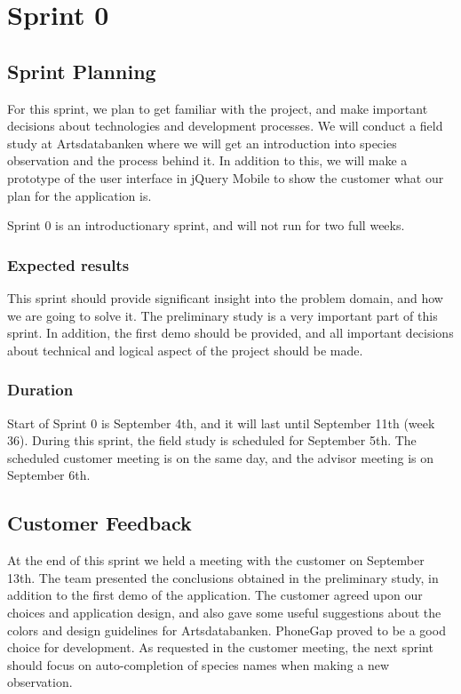 \section{Sprint 0}

\subsection{Sprint Planning}
For this sprint, we plan to get familiar with the project, and make important
decisions about technologies and development processes. We will conduct a field
study at Artsdatabanken where we will get an introduction into species
observation and the process behind it. In addition to this, we will make a
prototype of the user interface in jQuery Mobile to show the customer what our
plan for the application is.

Sprint 0 is an introductionary sprint, and will not run for two full weeks.

\subsubsection{Expected results}
This sprint should provide significant
insight into the problem domain, and how we are going to solve it. The
preliminary study is a very important part of this sprint. In addition, the
first demo should be provided, and all important decisions about technical and
logical aspect of the project should be made.

\subsubsection{Duration}
Start of Sprint 0 is September 4th, and it will last
until September 11th (week 36). During this sprint, the field study is
scheduled for September 5th. The scheduled customer meeting is on the same
day, and the advisor meeting is on September 6th.



\subsection{Customer Feedback}
At the end of this sprint we held a meeting with
the customer on September 13th. The team presented the conclusions obtained in
the preliminary study, in addition to the first demo of the application. The
customer agreed upon our choices and application design, and also gave some
useful suggestions about the colors and design guidelines for Artsdatabanken.
PhoneGap proved to be a good choice for development.  As requested in the
customer meeting, the next sprint should focus on auto-completion of species
names when making a new observation.

